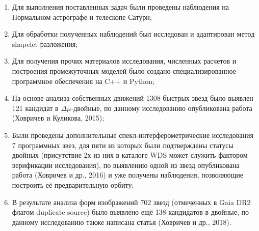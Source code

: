 \begin{enumerate}
 \item Для выполнения поставленных задач были проведены наблюдения на Нормальном астрографе и телескопе \glqq Сатурн\grqq ;
 \item Для обработки полученных наблюдений был исследован и адаптирован метод shapelet-разложения;
   \item Для получения прочих материалов исследования, численных расчетов и построения промежуточных моделей было создано специализированное программное обеспечения на C++ и Python;
 \item На основе анализа собственных движений 1308 быстрых звезд было выявлен 121 кандидат в $\Delta\mu$-двойные, по данному исследованию опубликована работа (Ховричев и Куликова, 2015);
 \item Были проведены дополнительные спекл-интерферометрические исследования 7 программных звез, для пяти из которых были подтверждены статусы двойных (присутствие 2х из них в каталоге WDS может служить фактором верификации исследования), по выявлению одной из звезд опубликована работа (Ховричев и др., 2016) и уже получены наблюдения, позволяющие построить её предварительную орбиту;
   \item В результате анализа форм изображений 702 звезд (отмеченных в Gaia DR2 флагом \glqq duplicate source\grqq ) было выявлено ещё 138 кандидатов в двойные, по данному исследованию также написана статья (Ховричев и др., 2018).
\end{enumerate}
